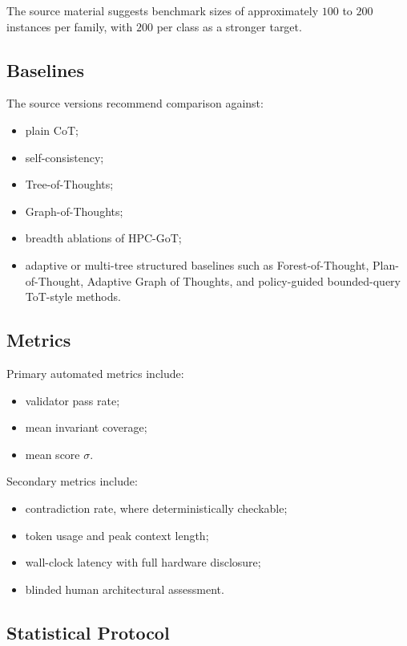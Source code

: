 \documentclass[11pt,a4paper]{article}
\numberwithin{equation}{section}
\theoremstyle{definition}
\begin{document}
The source material suggests benchmark sizes of approximately \(100\) to \(200\) instances per family, with \(200\) per class as a stronger target.

\subsection{Baselines}

The source versions recommend comparison against:
\begin{itemize}[leftmargin=2em]
    \item plain CoT;
    \item self-consistency;
    \item Tree-of-Thoughts;
    \item Graph-of-Thoughts;
    \item breadth ablations of HPC-GoT;
    \item adaptive or multi-tree structured baselines such as Forest-of-Thought, Plan-of-Thought, Adaptive Graph of Thoughts, and policy-guided bounded-query ToT-style methods.
\end{itemize}

\subsection{Metrics}

Primary automated metrics include:
\begin{itemize}[leftmargin=2em]
    \item validator pass rate;
    \item mean invariant coverage;
    \item mean score \(\sigma\).
\end{itemize}

Secondary metrics include:
\begin{itemize}[leftmargin=2em]
    \item contradiction rate, where deterministically checkable;
    \item token usage and peak context length;
    \item wall-clock latency with full hardware disclosure;
    \item blinded human architectural assessment.
\end{itemize}

\subsection{Statistical Protocol}
\end{document}

